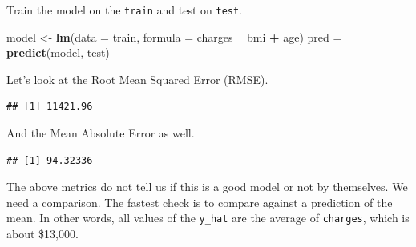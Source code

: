 \documentclass[
  openany]{book}
\newenvironment{Shaded}{\begin{snugshade}}{\end{snugshade}}
\newcommand{\ControlFlowTok}[1]{\textcolor[rgb]{0.13,0.29,0.53}{\textbf{#1}}}
\newcommand{\DataTypeTok}[1]{\textcolor[rgb]{0.13,0.29,0.53}{#1}}
\newcommand{\DecValTok}[1]{\textcolor[rgb]{0.00,0.00,0.81}{#1}}
\newcommand{\KeywordTok}[1]{\textcolor[rgb]{0.13,0.29,0.53}{\textbf{#1}}}
\newcommand{\NormalTok}[1]{#1}
\newcommand{\OperatorTok}[1]{\textcolor[rgb]{0.81,0.36,0.00}{\textbf{#1}}}
\newcommand{\StringTok}[1]{\textcolor[rgb]{0.31,0.60,0.02}{#1}}
\begin{document}
Train the model on the \texttt{train} and test on \texttt{test}.

\begin{Shaded}
\begin{Highlighting}[]
\NormalTok{model <-}\StringTok{ }\KeywordTok{lm}\NormalTok{(}\DataTypeTok{data =}\NormalTok{ train, }\DataTypeTok{formula =}\NormalTok{ charges }\OperatorTok{~}\StringTok{ }\NormalTok{bmi }\OperatorTok{+}\StringTok{ }\NormalTok{age)}
\NormalTok{pred =}\StringTok{ }\KeywordTok{predict}\NormalTok{(model, test)}
\end{Highlighting}
\end{Shaded}

Let's look at the Root Mean Squared Error (RMSE).

\begin{Shaded}
\end{Shaded}

\begin{verbatim}
## [1] 11421.96
\end{verbatim}

And the Mean Absolute Error as well.

\begin{Shaded}
\end{Shaded}

\begin{verbatim}
## [1] 94.32336
\end{verbatim}

The above metrics do not tell us if this is a good model or not by themselves. We need a comparison. The fastest check is to compare against a prediction of the mean. In other words, all values of the \texttt{y\_hat} are the average of \texttt{charges}, which is about \$13,000.
\end{document}
